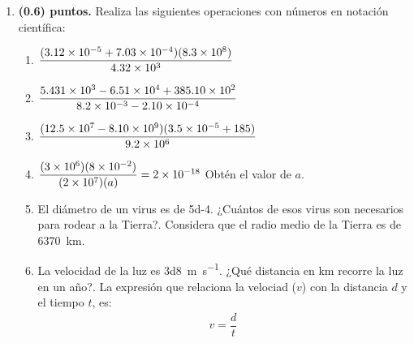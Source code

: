 \documentclass[14pt]{extarticle}
\begin{document}
\begin{enumerate}
\begin{enumerate}
\end{enumerate}
\item \textbf{(0.6) puntos.} Realiza las siguientes operaciones con números en notación científica:
\begin{enumerate}
    \itemsep1em
    \item $\dfrac{(\num{3.12d-5} + \num{7.03d-4})(\num{8.3d8})}{\num{4.32d3}}$
    \item $\dfrac{\num{5.431d3} - \num{6.51d4} + \num{385.10d2}}{\num{8.2d-3} - \num{2.10d-4}}$
    \item $\dfrac{(\num{12.5d7} - \num{8.10d9})(\num{3.5d-5} + 185)}{\num{9.2d6}}$
    \item $\dfrac{(\num{3d6})(\num{8d-2})}{(\num{2d7}) (a)} = \num{2d-18}$ \quad Obtén el valor de $a$.
    \item El diámetro de un virus es de \num{5d-4}. ¿Cuántos de esos virus son necesarios para rodear a la Tierra?. Considera que el radio medio de la Tierra es de \SI{6370}{\kilo\meter}.
    \item La velocidad de la luz es \SI{3d8}{\meter\per\second}. ¿Qué distancia en \unit{\kilo\meter} recorre la luz en un año?. La expresión que relaciona la velociad ($v$) con la distancia $d$ y el tiempo $t$, es:
    \begin{align*}
    v = \dfrac{d}{t}
    \end{align*}
\end{enumerate}
\end{enumerate}
\end{document}
